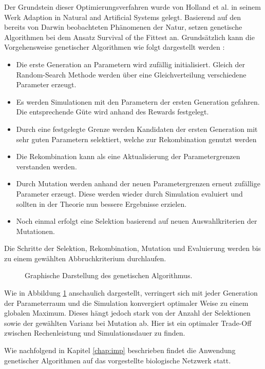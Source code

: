 		Der Grundstein dieser Optimierungsverfahren wurde von Holland et al. in seinem Werk \glqq Adaption in Natural and Artificial Systems\grqq{} \cite{Holland1992} gelegt. Basierend auf den bereits von Darwin\cite{Darwin1859} beobachteten Phänomenen der Natur, setzen genetische Algorithmen bei dem Ansatz \glqq Survival of the Fittest\grqq{} an. Grundsätzlich kann die Vorgehensweise genetischer Algorithmen wie folgt dargestellt werden \cite{Goldberg1989}:
		\begin{itemize}
			\item Die erste Generation an Parametern wird zufällig initialisiert. Gleich der Random-Search Methode werden über eine Gleichverteilung verschiedene Parameter erzeugt.
			\item Es werden Simulationen mit den Parametern der ersten Generation gefahren. Die entsprechende Güte wird anhand des Rewards festgelegt.
			\item Durch eine festgelegte Grenze werden Kandidaten der ersten Generation mit sehr guten Parametern selektiert, welche zur Rekombination genutzt werden
			\item Die Rekombination kann als eine Aktualisierung der Parametergrenzen verstanden werden.
			\item Durch Mutation werden anhand der neuen Parametergrenzen erneut zufällige Parameter erzeugt. Diese werden wieder durch Simulation evaluiert und sollten in der Theorie nun bessere Ergebnisse erzielen.
			\item Noch einmal erfolgt eine Selektion basierend auf neuen Auswahlkriterien der Mutationen.
		\end{itemize}
		Die Schritte der Selektion, Rekombination, Mutation und Evaluierung werden bis zu einem gewählten Abbruchkriterium durchlaufen.
		\begin{figure}[H] %
			\centering
			\def\svgwidth{12cm}
			
			\caption{Graphische Darstellung des genetischen Algorithmus.}
			\label{fig:gen_chart}
		\end{figure}
		Wie in Abbildung \ref{fig:gen_chart} anschaulich dargestellt, verringert sich mit jeder Generation der Parameterraum und die Simulation konvergiert optimaler Weise zu einem globalen Maximum. Dieses hängt jedoch stark von der Anzahl der Selektionen sowie der gewählten Varianz bei Mutation ab. Hier ist ein optimaler Trade-Off zwischen Rechenleistung und Simulationsdauer zu finden.
		
		Wie nachfolgend in Kapitel \ref{chap:imp} beschrieben findet die Anwendung genetischer Algorithmen auf das vorgestellte biologische Netzwerk statt.
	
